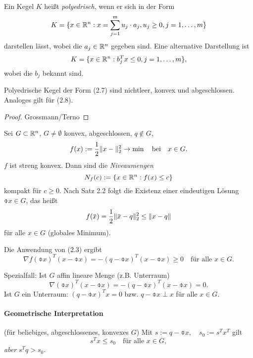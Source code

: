 \begin{defn}
  Ein Kegel $K$ heißt \emph{polyedrisch}, wenn er sich in der Form
  \begin{equation} %
    K = \{ x \in \real^n : x = \sum_{j=1}^m u_j \cdot a_j, u_j \ge 0, j = 1,
    \ldots, m \}
  \end{equation}
  darstellen lässt, wobei die $a_j \in \mathbb{R}^n$ gegeben sind. Eine alternative
  Darstellung ist
  \begin{equation} %
    K = \{ x \in \real^n : b_j^T x \le 0, j = 1, \ldots, m \},
  \end{equation}
  wobei die $b_j$ bekannt sind.
\end{defn}

\begin{lem} %
  Polyedrische Kegel der Form (2.7) sind nichtleer, konvex und abgeschlossen.
  Analoges gilt für (2.8).
\end{lem}

\begin{proof}
  Grossmann/Terno
\end{proof}

\begin{exmp}
  Sei $G \subset \mathbb{R}^n$, $G \ne \emptyset$ konvex, abgeschlossen, $q \notin
  G$,
  \[ f(x) := \frac{1}{2} \| x - \|_2^2 \to \min \quad \text{bei} \quad x \in G. \]
  $f$ ist streng konvex. Dann sind die \emph{Niveaumengen}
  \[ N_f(c) := \{ x \in \mathbb{R}^n : f(x) \le c \} \]
  kompakt für $c \ge 0$. Nach Satz 2.2 folgt die Existenz einer eindeutigen
  Lösung $\obar{x} \in G$, das heißt
  \[ f( \obar{x} ) = \rez{2} \| \obar{x} - q \|_2^2 \le \| x - q \| \]
  für alle $x \in G$ (globales Minimum).

  Die Anwendung von (2.3) ergibt
  \[ \nabla f( \obar{x} )^T (x-\obar{x}) = - (q-\obar{x})^T(x-\obar{x}) \ge 0
    \quad \text{für alle } x \in G. \]

  Spezialfall: Ist $G$ affin lineare Menge (z.B. Unterraum)
  \[ \nabla(\obar{x})^T (x-\obar{x}) = - (q-\obar{x})^T(x-\obar{x}) = 0. \]
  Ist $G$ ein Unterraum: $(q-\obar{x})^T x = 0$ bzw. $q-\obar{x} \perp x$ für
  alle $x \in G$.

  \paragraph{Geometrische Interpretation}
  (für beliebiges, abgeschlossenes, konvexes $G$)
  Mit $s := q - \obar{x}, \quad s_0 := s^T x^T$ gilt
  \[ s^T x \le s_0 \quad \text{für alle } x \in G, \]
  \emph{aber} $s^T q > s_0$.
\end{exmp}

